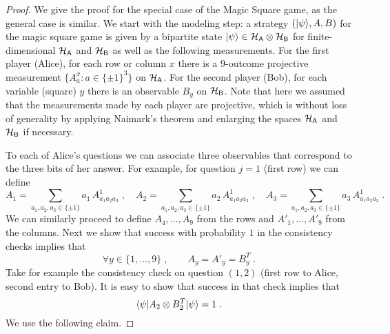 \begin{proof}
We give the proof for the special case of the Magic Square game, as the general case is similar. We start with the modeling step: a strategy $(|\psi\rangle,A,B)$ for the magic square game is given by a bipartite state $|\psi\rangle \in \mathcal{H}_{\textsf{A}} \otimes \mathcal{H}_{\textsf{B}}$ for finite-dimensional $\mathcal{H}_{\textsf{A}}$ and $\mathcal{H}_{{\textsf{B}}}$ as well as the following measurements. For the first player (Alice), for each row or column $x$ there is a $9$-outcome projective measurement $\{A^x_a : a\in\{\pm 1\}^3\}$ on $\mathcal{H}_{\textsf{A}}$. For the second player (Bob), for each variable (square) $y$ there is an observable $B_y$ on $\mathcal{H}_{\textsf{B}}$. Note that here we assumed that the measurements made by each player are projective, which is without loss of generality by applying Naimark's theorem and enlarging the spaces $\mathcal{H}_{\textsf{A}}$ and $\mathcal{H}_{\textsf{B}}$ if necessary. 

To each of Alice's questions we can associate three observables that correspond to the three bits of her answer. For example, for question $j=1$ (first row) we can define 
\[ A_1 = \sum_{a_1,a_2,a_3\in \{\pm 1\}}  a_1\, A^1_{a_1a_2a_3}\;,\quad   A_2 = \sum_{a_1,a_2,a_3\in \{\pm 1\}} a_2\, A^1_{a_1a_2a_3}\;,\quad  A_3 = \sum_{a_1,a_2,a_3\in \{\pm 1\}}  a_3\, A^1_{a_1a_2a_3}\;.\]
We can similarly proceed to define $A_4,\ldots,A_9$ from the rows and $A'_1,\ldots,A'_9$ from the columns. Next we show that success with probability $1$ in the consistency checks implies that 
\begin{equation}\label{eq:bcs-tensor-1}
\forall y\in\{1,\ldots,9\}\;,\qquad A_y = A'_y = B_y^T\;.
\end{equation} 
Take for example the consistency check on question $(1,2)$ (first row to Alice, second entry to Bob). It is easy to show that success in that check implies that 
\begin{equation}\label{eq:bcs-tensor-2}
\langle\psi| A_2 \otimes B_2^T |\psi\rangle=1\;.
\end{equation}
 We use the following claim.


\end{proof}
